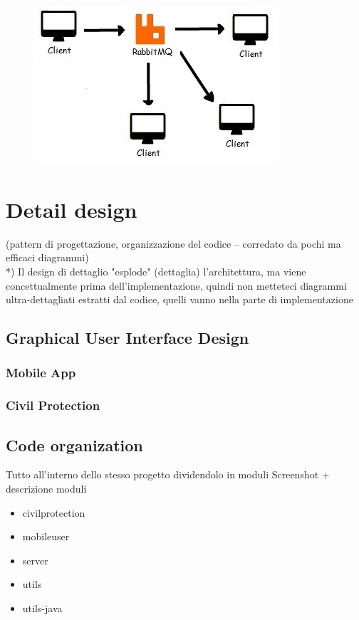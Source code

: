 \documentclass[a4paper,12pt]{report}
\begin{document}
\begin{figure}[ht]
\centering
\includegraphics{figures/ps.jpg}
\end{figure}

\chapter{Detail design}
(pattern di progettazione, organizzazione del codice -- corredato da pochi ma efficaci diagrammi)\\
*) Il design di dettaglio "esplode" (dettaglia) l'architettura, ma viene concettualmente prima dell'implementazione, quindi non metteteci diagrammi ultra-dettagliati estratti dal codice, quelli vanno nella parte di implementazione

\section{Graphical User Interface Design}
\subsection{Mobile App}
\subsection{Civil Protection}

\section{Code organization}
Tutto all'interno dello stesso progetto dividendolo in moduli
Screenshot + descrizione moduli
\begin{itemize}
\item civilprotection
\item mobileuser
\item server
\item utils
\item utils-java
\end{itemize}
\end{document}
